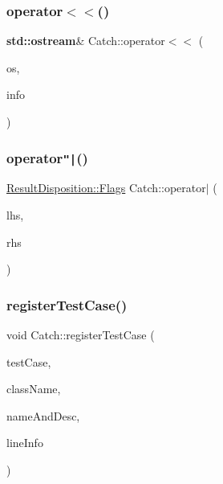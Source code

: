 \mbox{\label{namespace_catch_a6ec18b5054d7fdfdde861c580b082995}} 
\subsubsection{\texorpdfstring{operator$<$$<$()}{operator<<()}}
{\footnotesize\ttfamily \textbf{ std\+::ostream}\& Catch\+::operator$<$$<$ (\begin{DoxyParamCaption}\item[{\textbf{ std\+::ostream} \&}]{os,  }\item[{\hyperlink{struct_catch_1_1_source_line_info}{Source\+Line\+Info} const \&}]{info }\end{DoxyParamCaption})}

\mbox{\label{namespace_catch_ab32a083e442cc09f736327d2e2865999}} 
\subsubsection{\texorpdfstring{operator\texttt{"|}()}{operator|()}}
{\footnotesize\ttfamily \hyperlink{struct_catch_1_1_result_disposition_a3396cad6e2259af326b3aae93e23e9d8}{Result\+Disposition\+::\+Flags} Catch\+::operator$\vert$ (\begin{DoxyParamCaption}\item[{\hyperlink{struct_catch_1_1_result_disposition_a3396cad6e2259af326b3aae93e23e9d8}{Result\+Disposition\+::\+Flags}}]{lhs,  }\item[{\hyperlink{struct_catch_1_1_result_disposition_a3396cad6e2259af326b3aae93e23e9d8}{Result\+Disposition\+::\+Flags}}]{rhs }\end{DoxyParamCaption})\hspace{0.3cm}{\ttfamily [inline]}}

\mbox{\label{namespace_catch_a9a59d681cc327a33c280796561dfe258}} 
\subsubsection{\texorpdfstring{register\+Test\+Case()}{registerTestCase()}}
{\footnotesize\ttfamily void Catch\+::register\+Test\+Case (\begin{DoxyParamCaption}\item[{\hyperlink{struct_catch_1_1_i_test_case}{I\+Test\+Case} $\ast$}]{test\+Case,  }\item[{char const $\ast$}]{class\+Name,  }\item[{\hyperlink{struct_catch_1_1_name_and_desc}{Name\+And\+Desc} const \&}]{name\+And\+Desc,  }\item[{\hyperlink{struct_catch_1_1_source_line_info}{Source\+Line\+Info} const \&}]{line\+Info }\end{DoxyParamCaption})}


